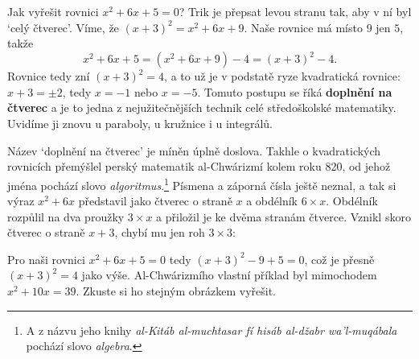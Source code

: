 Jak vyřešit rovnici $x^2 + 6x + 5 = 0$? Trik je přepsat levou stranu tak, aby v ní byl `celý čtverec'. Víme, že ${(x + 3)}^2 = x^2 + 6x + 9$. Naše rovnice má místo $9$ jen $5$, takže
\begin{equation*}
  x^2 + 6x + 5 = (x^2 + 6x + 9) - 4 = {(x + 3)}^2 - 4.
\end{equation*}
Rovnice tedy zní ${(x + 3)}^2 = 4$, a to už je v podstatě ryze kvadratická rovnice: $x + 3 = \pm 2$, tedy $x = -1$ nebo $x = -5$. Tomuto postupu se říká \textbf{doplnění na čtverec} a je to jedna z nejužitečnějších technik celé středoškolské matematiky. Uvidíme ji znovu u paraboly, u kružnice i u integrálů.

Název `doplnění na čtverec' je míněn úplně doslova. Takhle o kvadratických rovnicích přemýšlel perský matematik al-Chwárizmí kolem roku 820, od jehož jména pochází slovo \textit{algoritmus}.\footnote{A z názvu jeho knihy \textit{al-Kitáb al-muchtasar fí hisáb al-džabr wa'l-muqábala} pochází slovo \textit{algebra}.} Písmena a záporná čísla ještě neznal, a tak si výraz $x^2 + 6x$ představil jako čtverec o straně $x$ a obdélník $6\times x$. Obdélník rozpůlil na dva proužky $3\times x$ a přiložil je ke dvěma stranám čtverce. Vznikl skoro čtverec o straně $x + 3$, chybí mu jen roh $3\times 3$:
\begin{center}
\end{center}
Pro naši rovnici $x^2 + 6x + 5 = 0$ tedy ${(x + 3)}^2 - 9 + 5 = 0$, což je přesně ${(x + 3)}^2 = 4$ jako výše. Al-Chwárizmího vlastní příklad byl mimochodem $x^2 + 10x = 39$. Zkuste si ho stejným obrázkem vyřešit.

